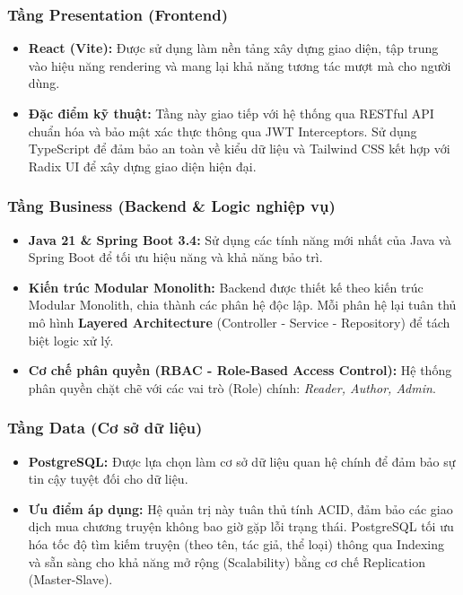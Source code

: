 \subsubsection{Tầng Presentation (Frontend)}
\begin{itemize}
    \item \textbf{React (Vite):} Được sử dụng làm nền tảng xây dựng giao diện, tập trung vào hiệu năng rendering và mang lại khả năng tương tác mượt mà cho người dùng.
    \item \textbf{Đặc điểm kỹ thuật:} Tầng này giao tiếp với hệ thống qua RESTful API chuẩn hóa và bảo mật xác thực thông qua JWT Interceptors. Sử dụng TypeScript để đảm bảo an toàn về kiểu dữ liệu và Tailwind CSS kết hợp với Radix UI để xây dựng giao diện hiện đại.
\end{itemize}

\subsubsection{Tầng Business (Backend \& Logic nghiệp vụ)}
\begin{itemize}
    \item \textbf{Java 21 \& Spring Boot 3.4:} Sử dụng các tính năng mới nhất của Java và Spring Boot để tối ưu hiệu năng và khả năng bảo trì.
    \item \textbf{Kiến trúc Modular Monolith:} Backend được thiết kế theo kiến trúc Modular Monolith, chia thành các phân hệ độc lập. Mỗi phân hệ lại tuân thủ mô hình \textbf{Layered Architecture} (Controller - Service - Repository) để tách biệt logic xử lý.
    \item \textbf{Cơ chế phân quyền (RBAC - Role-Based Access Control):} Hệ thống phân quyền chặt chẽ với các vai trò (Role) chính: \textit{Reader, Author, Admin}.
\end{itemize}

\subsubsection{Tầng Data (Cơ sở dữ liệu)}
\begin{itemize}
    \item \textbf{PostgreSQL:} Được lựa chọn làm cơ sở dữ liệu quan hệ chính để đảm bảo sự tin cậy tuyệt đối cho dữ liệu.
    \item \textbf{Ưu điểm áp dụng:} Hệ quản trị này tuân thủ tính ACID, đảm bảo các giao dịch mua chương truyện không bao giờ gặp lỗi trạng thái. PostgreSQL tối ưu hóa tốc độ tìm kiếm truyện (theo tên, tác giả, thể loại) thông qua Indexing  và sẵn sàng cho khả năng mở rộng (Scalability) bằng cơ chế Replication (Master-Slave).
\end{itemize}

